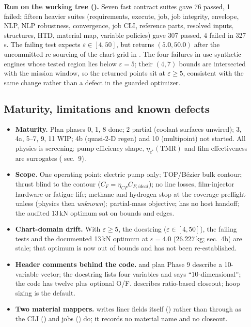 \textbf{Run on the working tree ().} Seven fast contract suites gave 76 passed, 1 failed; fifteen heavier suites (requirements, execute, job, job integrity, envelope, NLP, NLP robustness, convergence, job CLI, reference parts, resolved inputs, structures, HTD, material map, variable policies) gave 307 passed, 4 failed in 327\,s. The failing test  expects $\varepsilon\in[4,50]$, but  returns $(5.0,50.0)$ after the uncommitted re-sourcing of the chart grid in . The four failures in  use synthetic engines whose tested region lies below $\varepsilon=5$; their $(4,7)$ bounds are intersected with the mission window, so the returned points sit at $\varepsilon\ge5$, consistent with the same change rather than a defect in the guarded optimizer.

\subsection{Maturity, limitations and known defects}\label{sec:s13-limits}
\begin{itemize}
\item \textbf{Maturity.} Plan phases 0, 1, 8 done; 2 partial (coolant surfaces unwired); 3, 4a, 5--7, 9, 11 WIP; 4b (quasi-2-D regen) and 10 (multipoint) not started. All physics is screening; pump-efficiency shape, $\eta_{c^*}(\mathrm{TMR})$ and film effectiveness are surrogates ( sec.~9).
\item \textbf{Scope.} One operating point; electric pump only; TOP/B\'ezier bulk contour; thrust blind to the contour ($C_F=\eta_{CF}C_{F,ideal}$); no line losses, film-injector hardware or fatigue life; methane and hydrogen stop at the coverage preflight unless  (physics then \emph{unknown}); partial-mass objective;  has no host handoff; the audited 13\,kN optimum sat on bounds and edges.
\item \textbf{Chart-domain drift.} With $\varepsilon\ge5$, the  docstring ($\varepsilon\in[4,50]$), the failing tests and the documented 13\,kN optimum at $\varepsilon=4.0$ (26.227\,kg;  sec.~4b) are stale; that optimum is now out of bounds and has not been re-established.
\item \textbf{Header comments behind the code.}  and plan Phase 9 describe a 10-variable vector; the  docstring lists four variables and  says ``10-dimensional''; the code has twelve plus optional O/F.  describes ratio-based closeout; hoop sizing is the default.
\item \textbf{Two material mappers.}  writes liner fields itself () rather than through  as the CLI () and jobs () do; it records no material name and no closeout.
\end{itemize}

